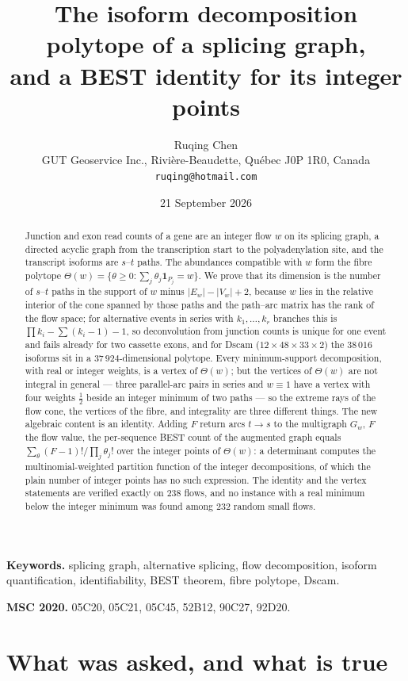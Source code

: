 \documentclass[11pt]{article}
\title{\bfseries The isoform decomposition polytope of a splicing graph,\\
and a BEST identity for its integer points}
\author{Ruqing Chen\\[2pt]
\normalsize GUT Geoservice Inc., Rivi\`ere-Beaudette, Qu\'ebec J0P 1R0, Canada\\
\normalsize\texttt{ruqing@hotmail.com}}
\date{21 September 2026}
\theoremstyle{plain}
\theoremstyle{definition}
\theoremstyle{remark}
\newcommand{\Th}{\Theta}
\begin{document}
\maketitle

\begin{abstract}
\noindent
Junction and exon read counts of a gene are an integer flow $w$ on its splicing graph, a
directed acyclic graph from the transcription start to the polyadenylation site, and the
transcript isoforms are $s$--$t$ paths. The abundances compatible with $w$ form the fibre
polytope $\Th(w)=\{\theta\ge0:\sum_j\theta_j\mathbf 1_{P_j}=w\}$. We prove that its dimension
is the number of $s$--$t$ paths in the support of $w$ minus $|E_w|-|V_w|+2$, because $w$
lies in the relative interior of the cone spanned by those paths and the path--arc matrix has
the rank of the flow space; for alternative events in series with $k_1,\dots,k_r$ branches
this is $\prod k_i-\sum(k_i-1)-1$, so deconvolution from junction counts is unique for one
event and fails already for two cassette exons, and for Dscam ($12\times48\times33\times2$)
the $38\,016$ isoforms sit in a $37\,924$-dimensional polytope. Every minimum-support
decomposition, with real or integer weights, is a vertex of $\Th(w)$; but the vertices of
$\Th(w)$ are not integral in general --- three parallel-arc pairs in series and $w\equiv1$
have a vertex with four weights $\tfrac12$ beside an integer minimum of two paths --- so the
extreme rays of the flow cone, the vertices of the fibre, and integrality are three different
things. The new algebraic content is an identity. Adding $F$ return arcs $t\to s$ to the
multigraph $G_w$, $F$ the flow value, the per-sequence BEST count of the augmented graph
equals $\sum_\theta (F-1)!/\prod_j\theta_j!$ over the integer points of $\Th(w)$: a
determinant computes the multinomial-weighted partition function of the integer
decompositions, of which the plain number of integer points has no such expression. The
identity and the vertex statements are verified exactly on $238$ flows, and no instance with
a real minimum below the integer minimum was found among $232$ random small flows.
\end{abstract}

\medskip
\noindent\textbf{Keywords.} splicing graph, alternative splicing, flow decomposition, isoform
quantification, identifiability, BEST theorem, fibre polytope, Dscam.

\noindent\textbf{MSC 2020.} 05C20, 05C21, 05C45, 52B12, 90C27, 92D20.

\section{What was asked, and what is true}
\end{document}
